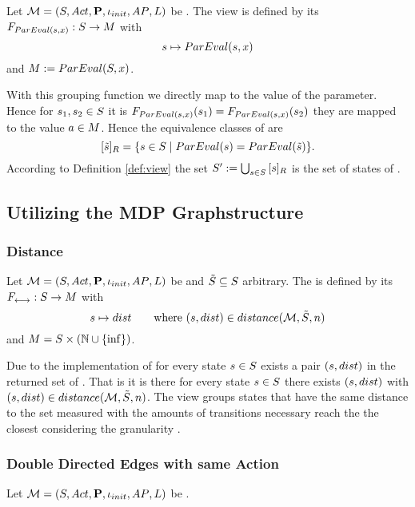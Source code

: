 \documentclass[preview]{standalone}
\begin{document}
\begin{definition}
	Let ${{{\mathcal{M}}}} = {{({S}, {Act}, {\textbf{P}}, {\iota_{init}}, {AP}, {L})}}$ be \chosengraphtypeN. The view \viewparamvalident is defined by its \grpfctN ${{F_{{ParEval}({s},{x})}}} : {S} \to {\ensuremath{{M}}}$ with
	\[
	{s} \mapsto {ParEval}({s},{x})
	\]
	and ${{M}} := {ParEval}({S}, {x})$.
\end{definition}

With this grouping function we directly map to the value of the parameter. Hence for ${s}_1, {s}_2 \in {S}$ it is ${{F_{{ParEval}({s},{x})}}}({s}_1) = {{F_{{ParEval}({s},{x})}}}({s}_2)$ \iffN they are mapped to the value ${a} \in {\ensuremath{{M}}}$. Hence the equivalence classes of \eqrelview are
\[
{{[{\tilde{{s}}}]_{{R}}}} = \{ {s} \in {S} \mid {ParEval}({s}) = {ParEval}({\tilde{{s}}})\}.
\]
According to Definition \ref{def:view} the set ${S}' := \bigcup_{{s} \in {S}} {{[{s}]_{{R}}}}$ is the set of states of \viewparamvalident.


\subsection{Utilizing the MDP Graphstructure}
\subsubsection{Distance}
\begin{definition}
		Let ${{{\mathcal{M}}}} = {{({S}, {Act}, {\textbf{P}}, {\iota_{init}}, {AP}, {L})}}$ be \chosengraphtypeN and ${\tilde{{S}}} \subseteq {S}$ arbitrary.  The \viewN \viewdistance is defined by its \grpfctN ${{F_{{\longleftrightarrow}}}} : {S} \to {\ensuremath{{M}}}$ with 
		\[
		\state \mapsto \distval \quad \quad \text{where } (\state, \distval) \in \fctdistdefault
		\]
		and $M = {S} \times ({\mathbb{N}} \cup \{\inf\})$.
\end{definition}

Due to the implementation of \fctdistdefault for every state ${s} \in {S}$ exists a pair $({s}, {dist})$ in the returned set of \fctdistdefault. That is it is there for every state ${s} \in {S}$ there exists  $({s}, {dist})$ with $ (\state, \distval)\in \fctdistdefault$. The view groups states that have the same distance to the set measured with the amounts of transitions necessary reach the the closest \smstates considering the granularity \granularity.

\subsubsection{Double Directed Edges with same Action}
\begin{definition}
	Let ${{{\mathcal{M}}}} = {{({S}, {Act}, {\textbf{P}}, {\iota_{init}}, {AP}, {L})}}$ be \chosengraphtypeN.
\end{definition}
\end{document}
